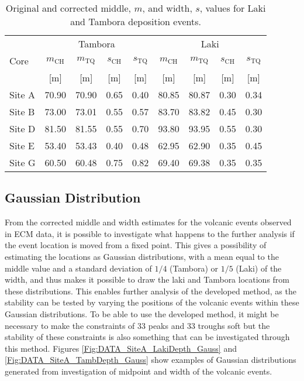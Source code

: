 \documentclass[../../CompleteThesis2/Complete_2ndDraft]{subfiles}
\begin{document}
\begin{table}[h]
	\centering
	\begin{tabular}{l|cc|cc|cc|cc|}
		& \multicolumn{4}{c|}{Tambora} & \multicolumn{4}{c|}{Laki}\\
		Core & $m_{\text{CH}}$ & $m_{\text{TQ}}$ & $s_{\text{CH}}$ & $s_{\text{TQ}}$& $m_{\text{CH}}$ & $m_{\text{TQ}}$ & $s_{\text{CH}}$ & $s_{\text{TQ}}$ \\
		 & [m] & [m] & [m] & [m]& [m] & [m] & [m] & [m] \\
		\hline
		Site A & 70.90 & 70.90 & 0.65 & 0.40 & 80.85 & 80.87 & 0.30 & 0.34 \\
		Site B & 73.00 & 73.01 & 0.55 & 0.57 & 83.70 & 83.82 & 0.45 & 0.30 \\	
		Site D & 81.50 & 81.55 & 0.55 & 0.70 & 93.80 & 93.95 & 0.55 & 0.30 \\
		Site E & 53.40 & 53.43 & 0.40 & 0.48 & 62.95 & 62.90 & 0.35 & 0.45 \\
		Site G & 60.50 & 60.48 & 0.75 & 0.82 & 69.40 & 69.38 & 0.35 & 0.35 \\
	\end{tabular}
	\caption[Corrected Laki and Tambora positions.]{\footnotesize Original and corrected middle, $m$, and width, $s$, values for Laki and Tambora deposition events.}
	\label{Tab:LakiTamb_corr}
\end{table}



\subsection[Gaussian Distribution]{Gaussian Distribution}
\label{Subsec:Data_VolcanicHorizons_GaussDist}


From the corrected middle and width estimates for the volcanic events observed in ECM data, it is possible to investigate what happens to the further analysis if the event location is moved from a fixed point. This gives a possibility of estimating the locations as Gaussian distributions, with a mean equal to the middle value and a standard deviation of $1/4$ (Tambora) or $1/5$ (Laki) of the width, and thus makes it possible to draw the laki and Tambora locations from these distributions. This enables further analysis of the developed method, as the stability can be tested by varying the positions of the volcanic events within these Gaussian distributions. To be able to use the developed method, it might be necessary to make the constraints of 33 peaks and 33 troughs soft but the stability of these constraints is also something that can be investigated through this method. Figures \ref{Fig:DATA_SiteA_LakiDepth_Gauss} and \ref{Fig:DATA_SiteA_TambDepth_Gauss} show examples of Gaussian distributions generated from investigation of midpoint and width of the volcanic events. 
\end{document}
